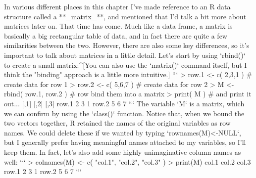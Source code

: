 In various different places in this chapter I've made reference to an R data structure called a **_matrix_**, and mentioned that I'd talk a bit more about matrices later on. That time has come. Much like a data frame, a matrix is basically a big rectangular table of data, and in fact there are quite a few similarities between the two. However, there are also some key differences, so it's important to talk about matrices in a little detail. Let's start by using `rbind()` to create a small matrix:^[You can also use the `matrix()` command itself, but I think the "binding" approach is a little more intuitive.]
```
> row.1 <- c( 2,3,1 )         # create data for row 1
> row.2 <- c( 5,6,7 )         # create data for row 2
> M <- rbind( row.1, row.2 )  # row bind them into a matrix
> print( M )                  # and print it out...
      [,1] [,2] [,3]
row.1    2    3    1
row.2    5    6    7
```
The variable `M` is a matrix, which we can confirm by using the `class()` function. Notice that, when we bound the two vectors together, R retained the names of the original variables as row names. We could delete these if we wanted by typing `rownames(M)<-NULL`, but I generally prefer having meaningful names attached to my variables, so I'll keep them. In fact, let's also add some highly unimaginative column names as well:
```
> colnames(M) <- c( "col.1", "col.2", "col.3" )
> print(M)
      col.1 col.2 col.3
row.1     2     3     1
row.2     5     6     7
```
